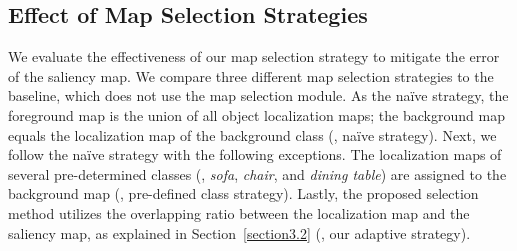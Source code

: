 \documentclass[final]{cvpr}
\begin{document}
\subsection{Effect of Map Selection Strategies}
We evaluate the effectiveness of our map selection strategy to mitigate the error of the saliency map. We compare three different map selection strategies to the baseline, which does not use the map selection module. As the na\"ive strategy, the foreground map is the union of all object localization maps; the background map equals the localization map of the background class (\ie, na\"ive strategy). Next, we follow the na\"ive strategy with the following exceptions. The localization maps of several pre-determined classes (\eg, \emph{sofa}, \emph{chair}, and \emph{dining table}) are assigned to the background map (\ie, pre-defined class strategy). Lastly, the proposed selection method utilizes the overlapping ratio between the localization map and the saliency map, as explained in Section~\ref{section3.2} (\ie, our adaptive strategy).
\end{document}
